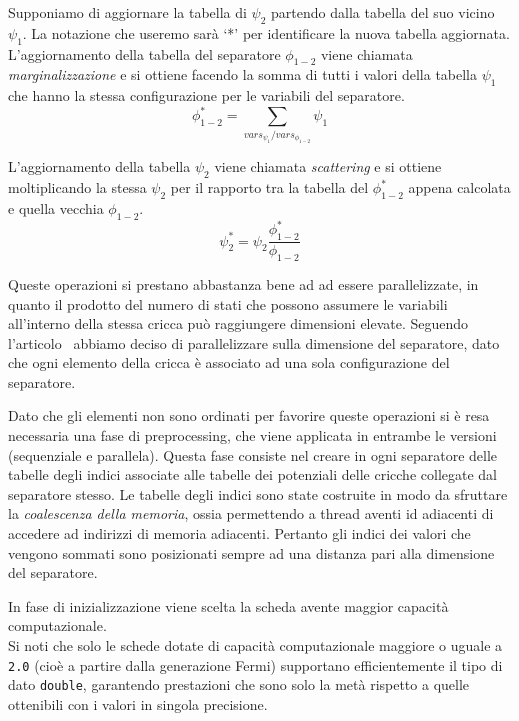 \documentclass[a4paper]{article}   %
\begin{document}
Supponiamo di aggiornare la tabella di $\psi_2$ partendo dalla tabella del suo vicino $\psi_1$.
La notazione che useremo sarà `*' per identificare la nuova tabella aggiornata.
L'aggiornamento della tabella del separatore $\phi_{1-2}$ viene chiamata \emph{marginalizzazione} e si ottiene facendo la somma di tutti i valori della tabella $\psi_1$ che hanno la stessa configurazione per le variabili del separatore.
\[
\phi_{1-2}^* = \sum_{vars_{\psi_1}/vars_{\phi_{1-2}}} \psi_1
\]

L'aggiornamento della tabella $\psi_2$ viene chiamata \emph{scattering} e si ottiene moltiplicando la stessa $\psi_2$ per il rapporto tra la tabella del $\phi_{1-2}^*$ appena calcolata e quella vecchia $\phi_{1-2}$.
\[
\psi_2^* = \psi_2 \frac{\phi_{1-2}^*}{\phi_{1-2}}
\]

Queste operazioni si prestano abbastanza bene ad ad essere parallelizzate, in quanto il prodotto del numero di stati che possono assumere le variabili all'interno della stessa cricca può raggiungere dimensioni elevate.
Seguendo l'articolo~\cite{zheng2011belief} abbiamo deciso di parallelizzare sulla dimensione del separatore, dato che ogni elemento della cricca è associato ad una sola configurazione del separatore.

Dato che gli elementi non sono ordinati per favorire queste operazioni si è resa necessaria una fase di preprocessing, che viene applicata in entrambe le versioni (sequenziale e parallela). %
Questa fase consiste nel creare in ogni separatore delle tabelle degli indici associate alle tabelle dei potenziali delle cricche collegate dal separatore stesso.
Le tabelle degli indici sono state costruite %
in modo da sfruttare la \emph{coalescenza della memoria}, ossia permettendo a thread aventi id adiacenti di accedere ad indirizzi di memoria adiacenti. Pertanto gli indici dei valori che vengono sommati sono posizionati sempre ad una distanza pari alla dimensione del separatore.

In fase di inizializzazione viene scelta la scheda avente maggior capacità computazionale.\\
Si noti che solo le schede dotate di capacità computazionale maggiore o uguale a {\tt 2.0} (cioè a partire dalla generazione Fermi) supportano efficientemente il tipo di dato {\tt double}, garantendo prestazioni che sono solo la metà rispetto a quelle ottenibili con i valori in singola precisione. 
\end{document}
